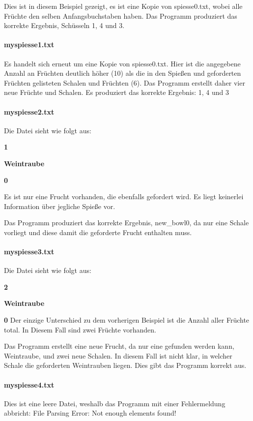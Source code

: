 \documentclass[a4paper,10pt,ngerman]{scrartcl}
\begin{document}
Dies ist in diesem Beispiel gezeigt, es ist eine Kopie von spiesse0.txt, wobei alle Früchte den selben Anfangsbuchstaben haben.
Das Programm produziert das korrekte Ergebnis, Schüsseln 1, 4 und 3.

\paragraph{myspiesse1.txt}
Es handelt sich erneut um eine Kopie von spiesse0.txt.
Hier ist die angegebene Anzahl an Früchten deutlich höher (10) als die in den Spießen und geforderten Früchten gelisteten Schalen und Früchten (6).
Das Programm erstellt daher vier neue Früchte und Schalen.
Es produziert das korrekte Ergebnis: 1, 4 und 3

\paragraph{myspiesse2.txt}
Die Datei sieht wie folgt aus:

\textbf{1}

\textbf{Weintraube}

\textbf{0}

Es ist nur eine Frucht vorhanden, die ebenfalls gefordert wird.
Es liegt keinerlei Information über jegliche Spieße vor.

Das Programm produziert das korrekte Ergebnis, new\_bowl0, da nur eine Schale vorliegt und diese damit die geforderte Frucht enthalten muss.

\paragraph{myspiesse3.txt}
Die Datei sieht wie folgt aus:

\textbf{2}

\textbf{Weintraube}

\textbf{0}
Der einzige Unterschied zu dem vorherigen Beispiel ist die Anzahl aller Früchte total.
In Diesem Fall sind zwei Früchte vorhanden.

Das Programm erstellt eine neue Frucht, da nur eine gefunden werden kann, Weintraube, und zwei neue Schalen.
In diesem Fall ist nicht klar, in welcher Schale die geforderten Weintrauben liegen.
Dies gibt das Programm korrekt aus.

\paragraph{myspiesse4.txt}
Dies ist eine leere Datei, weshalb das Programm mit einer Fehlermeldung abbricht: \glqq File Parsing Error: Not enough elements found!\grqq{}
\end{document}
